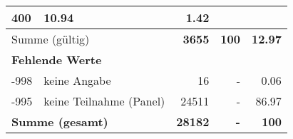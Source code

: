 \begin{longtable}{lXrrr}
       \num{400} &
       \num[round-mode=places,round-precision=2]{10.94} &
         \num[round-mode=places,round-precision=2]{1.42} \\
     \midrule
     \multicolumn{2}{l}{Summe (gültig)} &
       \textbf{\num{3655}} &
     \textbf{100} &
       \textbf{\num[round-mode=places,round-precision=2]{12.97}} \\
     \multicolumn{5}{l}{\textbf{Fehlende Werte}}\\
       -998 &
       keine Angabe &
         \num{16} &
        - &
         \num[round-mode=places,round-precision=2]{0.06} \\
       -995 &
       keine Teilnahme (Panel) &
         \num{24511} &
        - &
         \num[round-mode=places,round-precision=2]{86.97} \\
     \midrule
     \multicolumn{2}{l}{\textbf{Summe (gesamt)}} &
          \textbf{\num{28182}} &
        \textbf{-} &
        \textbf{100} \\
     \bottomrule
     \end{longtable}
     
